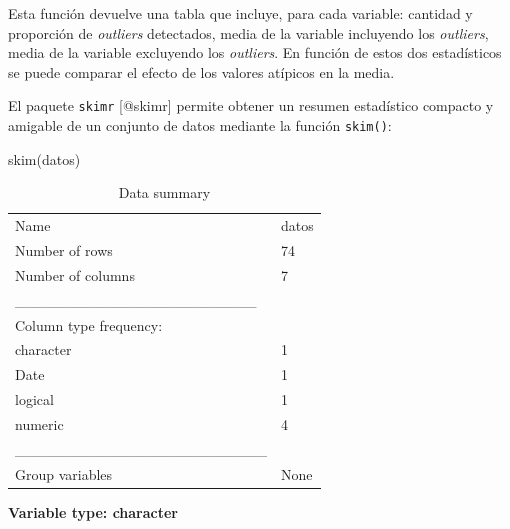 \documentclass[
  spanish,
  letterpaper,
  DIV=11,
  numbers=noendperiod]{scrreprt}
\newenvironment{Shaded}{\begin{snugshade}}{\end{snugshade}}
\newcommand{\FunctionTok}[1]{\textcolor[rgb]{0.28,0.35,0.67}{#1}}
\newcommand{\NormalTok}[1]{\textcolor[rgb]{0.00,0.23,0.31}{#1}}
\begin{document}
Esta función devuelve una tabla que incluye, para cada variable:
cantidad y proporción de \emph{outliers} detectados, media de la
variable incluyendo los \emph{outliers}, media de la variable excluyendo
los \emph{outliers}. En función de estos dos estadísticos se puede
comparar el efecto de los valores atípicos en la media.

El paquete \texttt{skimr} {[}@skimr{]} permite obtener un resumen
estadístico compacto y amigable de un conjunto de datos mediante la
función \texttt{skim()}:

\begin{Shaded}
\begin{Highlighting}[]
\FunctionTok{skim}\NormalTok{(datos)}
\end{Highlighting}
\end{Shaded}

\begin{longtable}[]{@{}ll@{}}
\caption{Data summary}\tabularnewline
\toprule\noalign{}
\endfirsthead
\endhead
\bottomrule\noalign{}
\endlastfoot
Name & datos \\
Number of rows & 74 \\
Number of columns & 7 \\
\_\_\_\_\_\_\_\_\_\_\_\_\_\_\_\_\_\_\_\_\_\_\_ & \\
Column type frequency: & \\
character & 1 \\
Date & 1 \\
logical & 1 \\
numeric & 4 \\
\_\_\_\_\_\_\_\_\_\_\_\_\_\_\_\_\_\_\_\_\_\_\_\_ & \\
Group variables & None \\
\end{longtable}

\textbf{Variable type: character}
\end{document}
